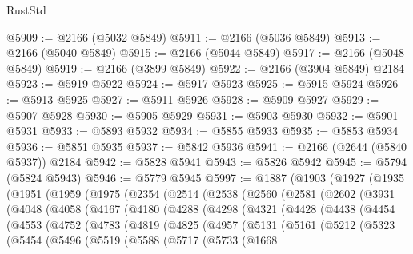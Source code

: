 \begin{lexlean}{RustStd}
\begin{coremodule}
@5909 := @2166 (@5032 @5849)
@5911 := @2166 (@5036 @5849)
@5913 := @2166 (@5040 @5849)
@5915 := @2166 (@5044 @5849)
@5917 := @2166 (@5048 @5849)
@5919 := @2166 (@3899 @5849)
@5922 := @2166 (@3904 @5849) @2184
@5923 := @5919 @5922
@5924 := @5917 @5923
@5925 := @5915 @5924
@5926 := @5913 @5925
@5927 := @5911 @5926
@5928 := @5909 @5927
@5929 := @5907 @5928
@5930 := @5905 @5929
@5931 := @5903 @5930
@5932 := @5901 @5931
@5933 := @5893 @5932
@5934 := @5855 @5933
@5935 := @5853 @5934
@5936 := @5851 @5935
@5937 := @5842 @5936
@5941 := @2166 (@2644 (@5840 @5937)) @2184
@5942 := @5828 @5941
@5943 := @5826 @5942
@5945 := @5794 (@5824 @5943)
@5946 := @5779 @5945
@5997 := @1887
    (@1903
      (@1927
        (@1935
          (@1951
            (@1959
              (@1975
                (@2354
                  (@2514
                    (@2538
                      (@2560
                        (@2581
                          (@2602
                            (@3931
                              (@4048
                                (@4058
                                  (@4167
                                    (@4180
                                      (@4288
                                        (@4298
                                          (@4321
                                            (@4428
                                              (@4438
                                                (@4454
                                                  (@4553
                                                    (@4752
                                                      (@4783
                                                        (@4819
                                                          (@4825
                                                            (@4957
                                                              (@5131
                                                                (@5161
                                                                  (@5212
                                                                    (@5323
                                                                      (@5454
                                                                        (@5496
                                                                          (@5519
                                                                            (@5588
                                                                              (@5717
                                                                                (@5733
                                                                                  (@1668

\end{coremodule}
\end{lexlean}

